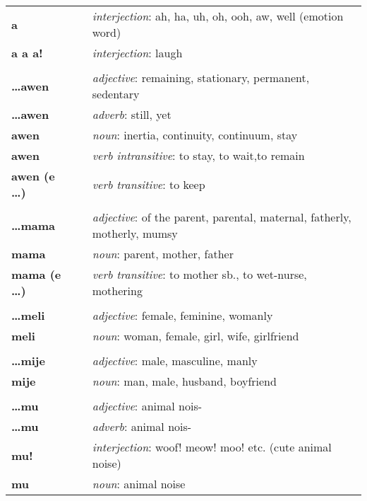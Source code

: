 \begin{supertabular}{p{2,5cm}|ll}
\textbf{a} && \textit{interjection}: ah, ha, uh, oh, ooh, aw, well (emotion word) \\ %
\textbf{a a a!} && \textit{interjection}: laugh \\ %
 && \\ %
\textbf{\dots awen} && \textit{adjective}: remaining, stationary, permanent, sedentary \\ %
\textbf{\dots awen} && \textit{adverb}: still, yet \\ %
\textbf{awen} && \textit{noun}: inertia, continuity, continuum, stay \\ %
\textbf{awen} && \textit{verb intransitive}: to stay, to wait,to remain \\ %
\textbf{awen (e \dots)} && \textit{verb transitive}: to keep \\ %
 && \\ %
\textbf{\dots mama} && \textit{adjective}: of the parent, parental, maternal, fatherly, motherly, mumsy \\ %
\textbf{mama} && \textit{noun}: parent, mother, father \\ %
\textbf{mama (e \dots)} && \textit{verb transitive}: to mother sb., to wet-nurse, mothering \\ %
 && \\ %
\textbf{\dots meli} && \textit{adjective}: female, feminine, womanly \\ %
\textbf{meli} && \textit{noun}: woman, female, girl, wife, girlfriend \\ %
 && \\ %
\textbf{\dots mije} && \textit{adjective}: male, masculine, manly \\ %
\textbf{mije} && \textit{noun}: man, male, husband, boyfriend \\ %
 && \\ %
\textbf{\dots mu} && \textit{adjective}: animal nois- \\ %
\textbf{\dots mu} && \textit{adverb}: animal nois- \\ %
\textbf{mu!} && \textit{interjection}: woof! meow! moo! etc. (cute animal noise) \\ %
\textbf{mu} && \textit{noun}: animal noise \\ %

\end{supertabular}
